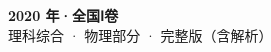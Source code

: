 \documentclass[zihao=-4, a4paper]{ctexart}
\begin{document}
\begin{center}
  {\Large\bfseries 2020 年·全国Ⅰ卷}\\[4pt]
  {\large 理科综合 · 物理部分 · 完整版（含解析）}
\end{center}
\medskip
{}

\clearpage
{}

\clearpage
{}

\end{document}
